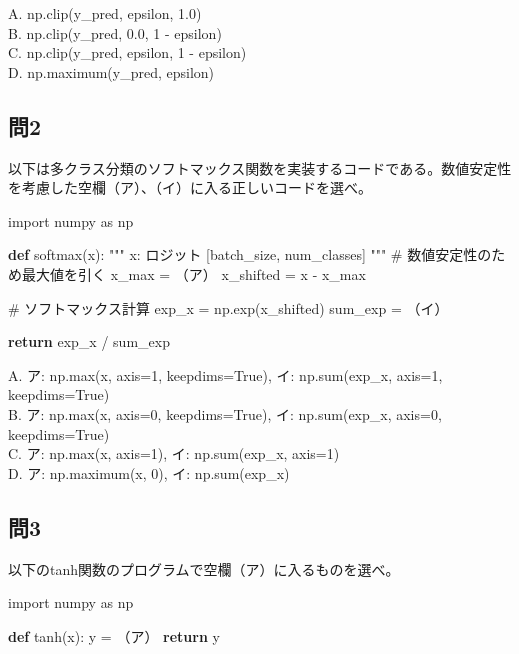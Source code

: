 \documentclass[
  letterpaper,
  DIV=11,
  numbers=noendperiod]{scrreprt}
\newenvironment{Shaded}{\begin{snugshade}}{\end{snugshade}}
\newcommand{\CommentTok}[1]{\textcolor[rgb]{0.37,0.37,0.37}{#1}}
\newcommand{\ControlFlowTok}[1]{\textcolor[rgb]{0.00,0.23,0.31}{\textbf{#1}}}
\newcommand{\ImportTok}[1]{\textcolor[rgb]{0.00,0.46,0.62}{#1}}
\newcommand{\KeywordTok}[1]{\textcolor[rgb]{0.00,0.23,0.31}{\textbf{#1}}}
\newcommand{\NormalTok}[1]{\textcolor[rgb]{0.00,0.23,0.31}{#1}}
\newcommand{\OperatorTok}[1]{\textcolor[rgb]{0.37,0.37,0.37}{#1}}
\begin{document}
A. np.clip(y\_pred, epsilon, 1.0)\\
B. np.clip(y\_pred, 0.0, 1 - epsilon)\\
C. np.clip(y\_pred, epsilon, 1 - epsilon)\\
D. np.maximum(y\_pred, epsilon)

\subsection{問2}\label{ux554f2}

以下は多クラス分類のソフトマックス関数を実装するコードである。数値安定性を考慮した空欄（ア）、（イ）に入る正しいコードを選べ。

\begin{Shaded}
\begin{Highlighting}[]
\ImportTok{import}\NormalTok{ numpy }\ImportTok{as}\NormalTok{ np}

\KeywordTok{def}\NormalTok{ softmax(x):}
    \CommentTok{"""}
\CommentTok{    x: ロジット [batch\_size, num\_classes]}
\CommentTok{    """}
    \CommentTok{\# 数値安定性のため最大値を引く}
\NormalTok{    x\_max }\OperatorTok{=}\NormalTok{ （ア）}
\NormalTok{    x\_shifted }\OperatorTok{=}\NormalTok{ x }\OperatorTok{{-}}\NormalTok{ x\_max}
    
    \CommentTok{\# ソフトマックス計算}
\NormalTok{    exp\_x }\OperatorTok{=}\NormalTok{ np.exp(x\_shifted)}
\NormalTok{    sum\_exp }\OperatorTok{=}\NormalTok{ （イ）}
    
    \ControlFlowTok{return}\NormalTok{ exp\_x }\OperatorTok{/}\NormalTok{ sum\_exp}
\end{Highlighting}
\end{Shaded}

A. ア: np.max(x, axis=1, keepdims=True), イ: np.sum(exp\_x, axis=1,
keepdims=True)\\
B. ア: np.max(x, axis=0, keepdims=True), イ: np.sum(exp\_x, axis=0,
keepdims=True)\\
C. ア: np.max(x, axis=1), イ: np.sum(exp\_x, axis=1)\\
D. ア: np.maximum(x, 0), イ: np.sum(exp\_x)

\subsection{問3}\label{ux554f3}

以下のtanh関数のプログラムで空欄（ア）に入るものを選べ。

\begin{Shaded}
\begin{Highlighting}[]
\ImportTok{import}\NormalTok{ numpy }\ImportTok{as}\NormalTok{ np}

\KeywordTok{def}\NormalTok{ tanh(x):}
\NormalTok{    y }\OperatorTok{=}\NormalTok{ （ア）}
    \ControlFlowTok{return}\NormalTok{ y}
\end{Highlighting}
\end{Shaded}
\end{document}
